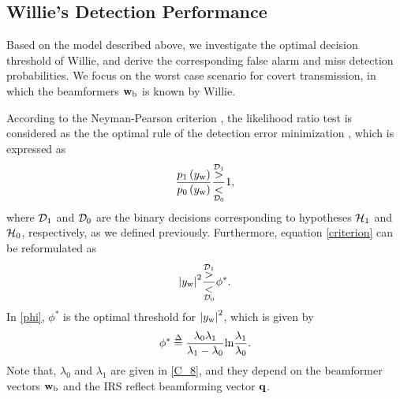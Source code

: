 \documentclass[10pt,journal,letterpaper,twocolumn,twoside]{IEEEtran} %
\begin{document}
\subsection{Willie's Detection Performance}

Based on the model described above, we   investigate  the optimal decision threshold of Willie, and derive the corresponding  false alarm
 and miss detection probabilities. We focus on the worst case scenario for covert transmission, in which the beamformers
${\mathbf{w}}_{\rm{b}}$ is  known by Willie.


 According to the
Neyman-Pearson criterion \cite{Lehmann_2005_Testing}, the likelihood
ratio test
is considered as the the optimal  rule  of  the  detection error  minimization \cite{Lehmann_2005_Testing} , which is expressed as
 \begin{align}\label{criterion}
\frac{{{p_1}\left( {{y_{\rm{w}}}} \right)}}{{{p_0}\left( {{y_{\rm{w}}}} \right)}}\frac{{\mathop  > \limits^{{{\cal D}_1}} }}{{\mathop  < \limits_{{{\cal D}_0}} }}1,
\end{align}
where ${{{\cal D}_1}}$ and ${{{\cal D}_0}}$ are the  binary decisions corresponding to hypotheses ${{{\cal H}_1}}$
and  ${{{\cal H}_0}}$, respectively, as we defined previously.
Furthermore, equation \eqref{criterion} can be reformulated as
\begin{align}\label{phi}
{\left| {{y_{\rm{w}}}} \right|^2} \frac{{\mathop  > \limits^{{{\cal D}_1}} }}{{\mathop  < \limits_{{{\cal D}_0}} }} {\phi ^*}.
\end{align}
In \eqref{phi}, ${\phi ^*}$ is the optimal threshold for ${\left| {{y_{\rm{w}}}} \right|^2}$, which is given by
\begin{align}
{\phi ^*} \buildrel \Delta \over = \frac{{{\lambda _0}{\lambda _1}}}{{{\lambda _1} - {\lambda _0}}}{\rm{ln}}\frac{{{\lambda _1}}}{{{\lambda _0}}}.
\end{align}
Note that, $\lambda _0$ and $\lambda _1$ are given in \eqref{C_8}, and they depend on the beamformer vectors ${\mathbf{w}}_{\rm{b}}$ and the IRS reflect beamforming vector ${\bf{q}}$.
\end{document}
